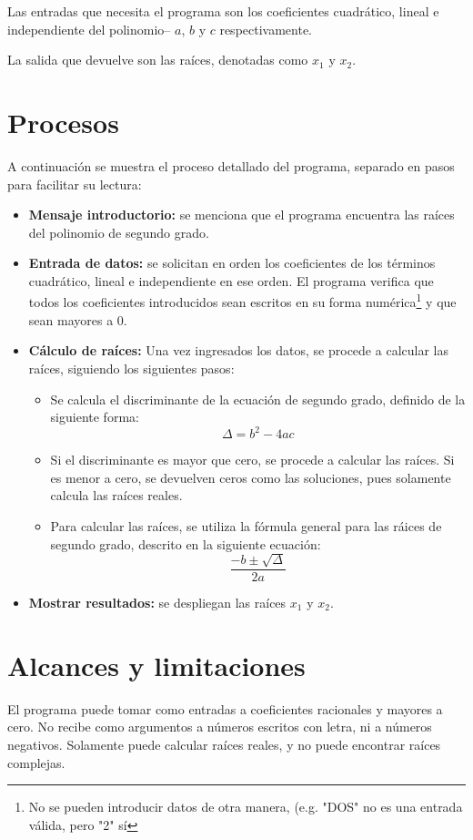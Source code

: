 \documentclass[conference]{IEEEtran}
\begin{document}
Las entradas que necesita el programa son los coeficientes cuadrático, lineal e independiente del polinomio– $a$, $b$ y $c$ respectivamente. 

La salida que devuelve son las raíces, denotadas como $x_1$ y $x_2$.

\section{Procesos}
A continuación se muestra el proceso detallado del programa, separado en pasos para facilitar su lectura:
\begin{itemize}
    \item \textbf{Mensaje introductorio:} se menciona que el programa encuentra las raíces del polinomio de segundo grado.
    \item \textbf{Entrada de datos:} se solicitan en orden los coeficientes de los términos cuadrático, lineal e independiente en ese orden. El programa verifica que todos los coeficientes introducidos sean escritos en su forma numérica\footnote{No se pueden introducir datos de otra manera, (e.g. "DOS" no es una entrada válida, pero "2" sí} y que sean mayores a 0.
    \item \textbf{Cálculo de raíces:} Una vez ingresados los datos, se procede a calcular las raíces, siguiendo los siguientes pasos:
    \begin{itemize}
        \item Se calcula el discriminante de la ecuación de segundo grado, definido de la siguiente forma: $$\Delta=b^2-4ac$$
        \item Si el discriminante es mayor que cero, se procede a calcular las raíces. Si es menor a cero, se devuelven ceros como las soluciones, pues solamente calcula las raíces reales.
        \item Para calcular las raíces, se utiliza la fórmula general para las ráices de segundo grado, descrito en la siguiente ecuación: $$\frac{-b\pm\sqrt{\Delta}}{2a}$$
    \end{itemize}
    \item \textbf{Mostrar resultados:} se despliegan las raíces $x_1$ y $x_2$.
\end{itemize}

\section{Alcances y limitaciones}
    El programa puede tomar como entradas a coeficientes racionales y mayores a cero. No recibe como argumentos a números escritos con letra, ni a números negativos. Solamente puede calcular raíces reales, y no puede encontrar raíces complejas. 
\end{document}
